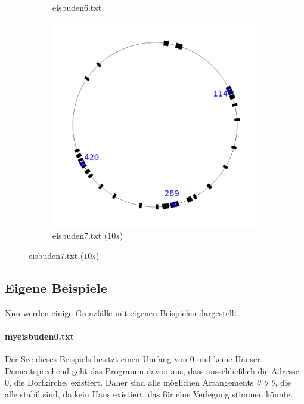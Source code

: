 \documentclass[a4paper,10pt,ngerman,captions=figureheading]{scrartcl}
\newcommand{\imageWidth}{0.3\linewidth}
\begin{document}
\begin{figure}[h!t]
\begin{subfigure}[t]{\imageWidth}
        \caption{eisbuden6.txt}
        \label{fig:eisbuden6}
    \end{subfigure}
    \begin{subfigure}[t]{\imageWidth}
        \includegraphics[width=\linewidth]{eisbuden7.png}
        \caption{eisbuden7.txt ($10s$)}
        \label{fig:eisbuden7}
    \end{subfigure}
\end{figure}

\subsection{Eigene Beispiele}
Nun werden einige Grenzfälle mit eigenen Beispielen dargestellt.

\paragraph{myeisbuden0.txt}
Der See dieses Beispiels besitzt einen Umfang von $0$ und keine Häuser.
Dementsprechend geht das Programm davon aus, dass ausschließlich die Adresse 0, die Dorfkirche, existiert.
Daher sind alle möglichen Arrangements \emph{0 0 0}, die alle stabil sind, da kein Haus existiert, das für eine Verlegung stimmen könnte.
\end{document}
